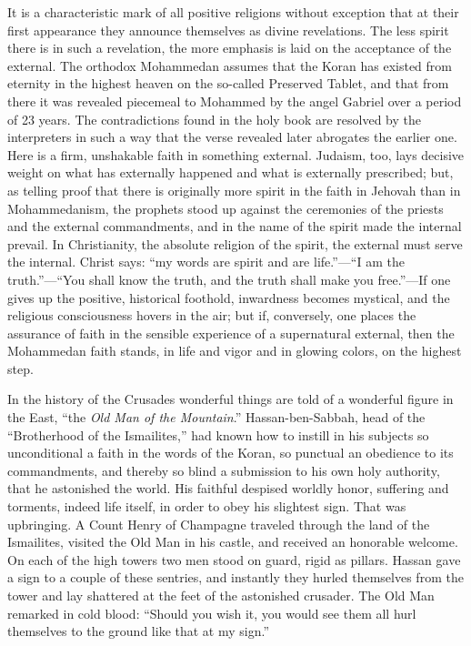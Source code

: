 \documentclass[12pt,a4paper,openany]{book}
\newcommand{\opage}[1]{\marginnote{\footnotesize\textit{[#1]}}}
\begin{document}
It is a characteristic mark of all positive religions without exception
that at their first appearance they announce themselves as divine
revelations. The less spirit there is in such a revelation, the \opage{18}more
emphasis is laid on the acceptance of the external. The orthodox
Mohammedan assumes that the Koran has existed from eternity in the
highest heaven on the so-called Preserved Tablet, and that from there it
was revealed piecemeal to Mohammed by the angel Gabriel over a period of
23 years. The contradictions found in the holy book are resolved by the
interpreters in such a way that the verse revealed later abrogates the
earlier one. Here is a firm, unshakable faith in something external.
Judaism, too, lays decisive weight on what has externally happened and
what is externally prescribed; but, as telling proof that there is
originally more spirit in the faith in Jehovah than in Mohammedanism,
the prophets stood up against the ceremonies of the priests and the
external commandments, and in the name of the spirit made the internal
prevail. In Christianity, the absolute religion of the spirit, the
external must serve the internal. Christ says: ``my words are spirit and
are life.''---``I am the truth.''---``You shall know the truth, and the
truth shall make you free.''---If one gives up the positive, historical
foothold, inwardness becomes mystical, and the religious consciousness
hovers in the air; but if, conversely, one places the assurance of faith
in the sensible experience of a supernatural external, then the
Mohammedan faith stands, in life and vigor and in glowing colors, on the
highest step.

In the history of the Crusades wonderful things are told of a wonderful
figure in the East, ``the \emph{Old Man of the Mountain}.''
Hassan-ben-Sabbah, head of the ``Brotherhood of the Ismailites,'' had
known how to instill in his subjects so unconditional a faith in the
words of the Koran, so punctual an obedience to its commandments, and
thereby so blind a submission to his \opage{19}own holy authority, that he
astonished the world. His faithful despised worldly honor, suffering and
torments, indeed life itself, in order to obey his slightest sign. That
was upbringing. A Count Henry of Champagne traveled through the land of
the Ismailites, visited the Old Man in his castle, and received an
honorable welcome. On each of the high towers two men stood on guard,
rigid as pillars. Hassan gave a sign to a couple of these sentries, and
instantly they hurled themselves from the tower and lay shattered at the
feet of the astonished crusader. The Old Man remarked in cold blood:
``Should you wish it, you would see them all hurl themselves to the
ground like that at my sign.''
\end{document}

